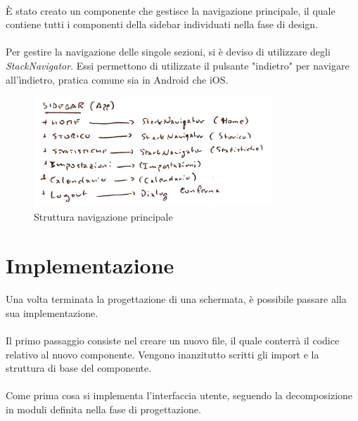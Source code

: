 \documentclass[12pt,a4paper,twoside,english,italian]{book}
\begin{document}
\paragraph{} È stato creato un componente che gestisce la navigazione principale, il quale contiene tutti i componenti della sidebar individuati nella fase di design.

\paragraph{} Per gestire la navigazione delle singole sezioni, si è deviso di utilizzare degli \emph{StackNavigator}. Essi permettono di utilizzate il pulsante "indietro" per navigare all'ìndietro, pratica comune sia in Android che iOS.  

\begin{figure}[H]
    \centering
    \includegraphics[width=0.8\textwidth]{img/navigation.pdf}
    \caption{Struttura navigazione principale}
\end{figure}



\section{Implementazione}

\paragraph{} Una volta terminata la progettazione di una schermata, è possibile passare alla sua implementazione. 

\paragraph{} Il primo passaggio consiste nel creare un nuovo file, il quale conterrà il codice relativo al nuovo componente. Vengono inanzitutto scritti gli import e la struttura di base del componente.

\paragraph{} Come prima cosa si implementa l'interfaccia utente, seguendo la decomposizione in moduli definita nella fase di progettazione. 
\end{document}
